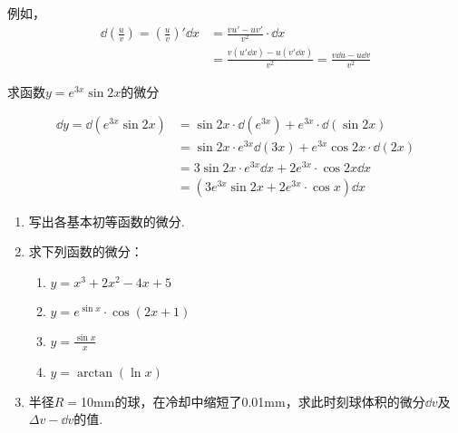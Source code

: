 例如，
\[\begin{split}
    \dd\left(\frac{u}{v}\right)=\left(\frac{u}{v}\right)'\dd x&=\frac{vu'-uv'}{v^2}\cdot \dd x\\
    &=\frac{v(u'\dd x)-u(v'\dd x)}{v^2}=\frac{v\dd u-u\dd v}{v^2}
\end{split}\]

\begin{example}
    求函数$y=e^{3x}\sin 2x$的微分
\end{example}

\begin{solution}
\[\begin{split}
\dd y=\dd (e^{3x}\sin 2x)&=\sin 2x\cdot \dd(e^{3x})+e^{3x}\cdot \dd (\sin2x)\\
&=\sin 2x\cdot e^{3x}\dd (3x)+e^{3x}\cos 2x\cdot \dd(2x)\\
&=3\sin 2x\cdot e^{3x}\dd x+2e^{3x}\cdot \cos2x\dd x\\
&=\left(3e^{3x}\sin2x+2e^{3x}\cdot \cos x\right)\dd x
    \end{split}\]
\end{solution}

\begin{ex}
\begin{enumerate}
    \item 写出各基本初等函数的微分.
    \item 求下列函数的微分：
\begin{multicols}{2}
\begin{enumerate}[(1)]
    \item $y=x^3+2x^2-4x+5$
    \item $y=e^{\sin x}\cdot \cos(2x+1)$
    \item $y=\frac{\sin x}{x}$
    \item $y=\arctan(\ln x)$
\end{enumerate}
\end{multicols}

    \item 半径$R=$10mm的球，在冷却中缩短了0.01mm，求此时刻球体积的微分$\dd v$及$\Delta v-\dd v$的值.
\end{enumerate}
\end{ex}









\begin{example}
    
\end{example}


